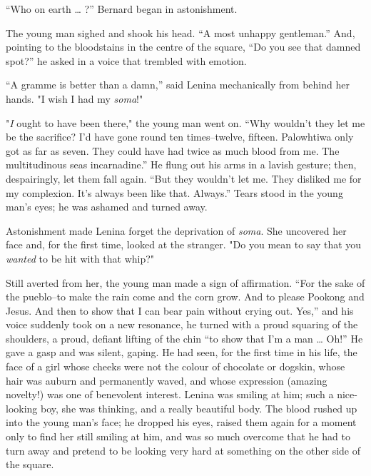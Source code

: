 \documentclass[12pt]{report}
\begin{document}
``Who on earth \ldots{} ?'' Bernard began in astonishment.

The young man sighed and shook his head. ``A most unhappy gentleman.''
And, pointing to the bloodstains in the centre of the square, ``Do you
see that damned spot?'' he asked in a voice that trembled with emotion.

``A gramme is better than a damn,'' said Lenina mechanically from behind
her hands. "I wish I had my \emph{soma}!"

"\emph{I} ought to have been there," the young man went on. ``Why
wouldn't they let me be the sacrifice? I'd have gone round ten
times--twelve, fifteen. Palowhtiwa only got as far as seven. They could
have had twice as much blood from me. The multitudinous seas
incarnadine.'' He flung out his arms in a lavish gesture; then,
despairingly, let them fall again. ``But they wouldn't let me. They
disliked me for my complexion. It's always been like that. Always.''
Tears stood in the young man's eyes; he was ashamed and turned away.

Astonishment made Lenina forget the deprivation of \emph{soma}. She
uncovered her face and, for the first time, looked at the stranger. "Do
you mean to say that you \emph{wanted} to be hit with that whip?"

Still averted from her, the young man made a sign of affirmation. ``For
the sake of the pueblo--to make the rain come and the corn grow. And to
please Pookong and Jesus. And then to show that I can bear pain without
crying out. Yes,'' and his voice suddenly took on a new resonance, he
turned with a proud squaring of the shoulders, a proud, defiant lifting
of the chin ``to show that I'm a man \ldots{} Oh!'' He gave a gasp and
was silent, gaping. He had seen, for the first time in his life, the
face of a girl whose cheeks were not the colour of chocolate or dogskin,
whose hair was auburn and permanently waved, and whose expression
(amazing novelty!) was one of benevolent interest. Lenina was smiling at
him; such a nice-looking boy, she was thinking, and a really beautiful
body. The blood rushed up into the young man's face; he dropped his
eyes, raised them again for a moment only to find her still smiling at
him, and was so much overcome that he had to turn away and pretend to be
looking very hard at something on the other side of the square.
\end{document}
